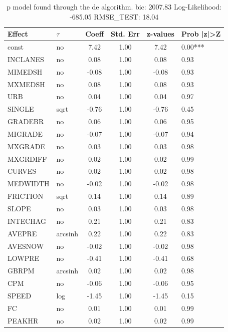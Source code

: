 \begin{table}
	\caption{p model found through the de algorithm. bic: 2007.83 Log-Likelihood: -685.05 RMSE_TEST: 18.04}
	\begin{center}
		\begin{tabular}{|l|l|c|c|c|l|}
			\hline
			Effect & $\tau$ & Coeff & Std. Err & z-values & Prob |z|>Z \\
			\hline
			const & no & 7.42 & 1.00 & 7.42 & 0.00*** \\
			\hline
			INCLANES & no & 0.08 & 1.00 & 0.08 & 0.93 \\
			\hline
			MIMEDSH & no & -0.08 & 1.00 & -0.08 & 0.93 \\
			\hline
			MXMEDSH & no & 0.08 & 1.00 & 0.08 & 0.93 \\
			\hline
			URB & no & 0.04 & 1.00 & 0.04 & 0.97 \\
			\hline
			SINGLE & sqrt & -0.76 & 1.00 & -0.76 & 0.45 \\
			\hline
			GRADEBR & no & 0.06 & 1.00 & 0.06 & 0.95 \\
			\hline
			MIGRADE & no & -0.07 & 1.00 & -0.07 & 0.94 \\
			\hline
			MXGRADE & no & 0.03 & 1.00 & 0.03 & 0.98 \\
			\hline
			MXGRDIFF & no & 0.02 & 1.00 & 0.02 & 0.99 \\
			\hline
			CURVES & no & 0.02 & 1.00 & 0.02 & 0.98 \\
			\hline
			MEDWIDTH & no & -0.02 & 1.00 & -0.02 & 0.98 \\
			\hline
			FRICTION & sqrt & 0.14 & 1.00 & 0.14 & 0.89 \\
			\hline
			SLOPE & no & 0.03 & 1.00 & 0.03 & 0.98 \\
			\hline
			INTECHAG & no & 0.21 & 1.00 & 0.21 & 0.83 \\
			\hline
			AVEPRE & arcsinh & 0.22 & 1.00 & 0.22 & 0.83 \\
			\hline
			AVESNOW & no & -0.02 & 1.00 & -0.02 & 0.98 \\
			\hline
			LOWPRE & no & -0.41 & 1.00 & -0.41 & 0.68 \\
			\hline
			GBRPM & arcsinh & 0.02 & 1.00 & 0.02 & 0.98 \\
			\hline
			CPM & no & -0.06 & 1.00 & -0.06 & 0.95 \\
			\hline
			SPEED & log & -1.45 & 1.00 & -1.45 & 0.15 \\
			\hline
			FC & no & 0.01 & 1.00 & 0.01 & 0.99 \\
			\hline
			PEAKHR & no & 0.02 & 1.00 & 0.02 & 0.99 \\

\end{tabular}
\end{center}
\end{table}
